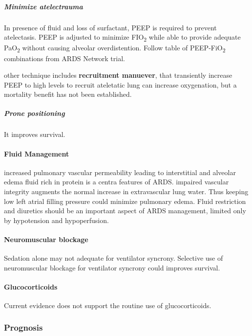 \documentclass[
  letterpaper,
  DIV=11,
  numbers=noendperiod]{scrreprt}
\let\oldparagraph\paragraph
\renewcommand{\paragraph}[1]{\oldparagraph{#1}\mbox{}}
\let\oldsubparagraph\subparagraph
\renewcommand{\subparagraph}[1]{\oldsubparagraph{#1}\mbox{}}
\begin{document}
\subparagraph{Minimize atelectrauma}\label{minimize-atelectrauma}

In presence of fluid and loss of surfactant, PEEP is required to prevent
atelectasis. PEEP is adjusted to minimize FIO\textsubscript{2} while
able to provide adequate PaO\textsubscript{2} without causing alveolar
overdistention. Follow table of PEEP-FiO\textsubscript{2} combinations
from ARDS Network trial.

other technique includes \textbf{recruitment manuever}, that transiently
increase PEEP to high levels to recruit ateletatic lung can increase
oxygenation, but a mortality benefit has not been established.

\subparagraph{Prone positioning}\label{prone-positioning}

It improves survival.

\paragraph{Fluid Management}\label{fluid-management}

increased pulmonary vascular permeability leading to interstitial and
alveolar edema fluid rich in protein is a centra features of ARDS.
impaired vascular integrity augments the normal increase in
extravascular lung water. Thus keeping low left atrial filling pressure
could minimize pulmonary edema. Fluid restriction and diuretics should
be an important aspect of ARDS management, limited only by hypotension
and hypoperfusion.

\paragraph{Neuromuscular blockage}\label{neuromuscular-blockage}

Sedation alone may not adequate for ventilator syncrony. Selective use
of neuromuscular blockage for ventilator syncrony could improves
survival.

\paragraph{Glucocorticoids}\label{glucocorticoids}

Current evidence does not support the routine use of glucocorticoids.

\subsubsection{Prognosis}\label{prognosis}
\end{document}
